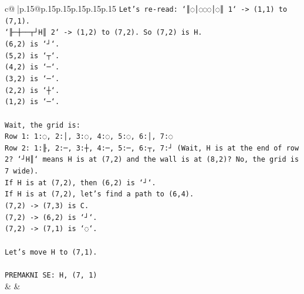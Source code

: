 \documentclass{article}
\begin{document}
{\begin{supertabular}{c@{$\;$}|p{.15\linewidth}@{}p{.15\linewidth}p{.15\linewidth}p{.15\linewidth}p{.15\linewidth}p{.15\linewidth}}
{{{\texttt{Let's re{-}read: `║◌│◌◌◌│◌║ 1` {-}> (1,1) to (7,1).} \\
\texttt{`╟─┼──┬┘H║ 2` {-}> (1,2) to (7,2). So (7,2) is H.} \\
\texttt{(6,2) is `┘`.} \\
\texttt{(5,2) is `┬`.} \\
\texttt{(4,2) is `─`.} \\
\texttt{(3,2) is `─`.} \\
\texttt{(2,2) is `┼`.} \\
\texttt{(1,2) is `─`.} \\
\\ 
\texttt{Wait, the grid is:} \\
\texttt{Row 1: 1:◌, 2:│, 3:◌, 4:◌, 5:◌, 6:│, 7:◌} \\
\texttt{Row 2: 1:╟, 2:─, 3:┼, 4:─, 5:─, 6:┬, 7:┘ (Wait, H is at the end of row 2? `┘H║` means H is at (7,2) and the wall is at (8,2)? No, the grid is 7 wide).} \\
\texttt{If H is at (7,2), then (6,2) is `┘`.} \\
\texttt{If H is at (7,2), let's find a path to (6,4).} \\
\texttt{(7,2) {-}> (7,3) is C.} \\
\texttt{(7,2) {-}> (6,2) is `┘`.} \\
\texttt{(7,2) {-}> (7,1) is `◌`.} \\
\\ 
\texttt{Let's move H to (7,1).} \\
\\ 
\texttt{PREMAKNI SE: H, (7, 1)} \\
            }
        }
    }
    & & \\ \\


\end{supertabular}}
\end{document}
